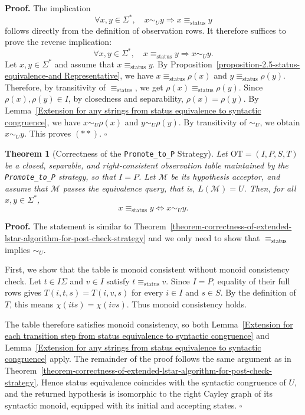 \documentclass{ieice-tecrep}
\newtheorem{theorem}{Theorem}
\begin{document}
\noindent\textbf{Proof.}
The implication
\[
   \forall x,y\in\Sigma^*,\quad
   x\sim_U y
   \Longrightarrow
   x\equiv_{\mathrm{status}}y
\]
follows directly from the definition of observation rows. It therefore
suffices to prove the reverse implication:
\[
\forall x,y\in\Sigma^*,\quad
x\equiv_{\mathrm{status}}y
\Longrightarrow
x\sim_U y. \tag{**}
\]
Let \(x,y\in\Sigma^*\) and assume that \(x\equiv_{\mathrm{status}}y\).
By Proposition~\ref{proposition-2.5-status-equivalence-and Representative},
we have \(x\equiv_{\mathrm{status}}\rho(x)\) and \(y\equiv_{\mathrm{status}}\rho(y)\).
Therefore, by transitivity of \(\equiv_{\mathrm{status}}\), we get \(\rho(x)\equiv_{\mathrm{status}}\rho(y)\).
Since \(\rho(x),\rho(y)\in I\), by closedness and separability, \(\rho(x) = \rho(y)\).
By Lemma~\ref{Extension for any strings from status equivalence to syntactic congruence},
we have \(x\sim_U\rho(x)\) and \(y\sim_U\rho(y)\).
By transitivity of \(\sim_U\), we obtain \(x\sim_U y\). This proves \((**)\).  \hfill $\square$

\begin{theorem}[Correctness of the \texttt{Promote\_to\_P} Strategy]
\label{theorem-correctness-of-the-promote_to_p-strategy}
Let \(\mathrm{OT}=(I,P,S,T)\) be a closed, separable, and right-consistent
observation table maintained by the \texttt{Promote\_to\_P} strategy,
so that \(I = P\).
Let \(\mathcal M\) be its hypothesis acceptor, and assume that
\(\mathcal M\) passes the equivalence query, that is,
\(L(\mathcal M)=U\).
Then, for all \(x,y\in\Sigma^*\),
\[
x\equiv_{\mathrm{status}}y
\Longleftrightarrow x\sim_U y.
\]
\end{theorem}
\noindent\textbf{Proof.}
The statement is similar to Theorem~\ref{theorem-correctness-of-extended-lstar-algorithm-for-post-check-strategy} and we
only need to show that \(\equiv_{\mathrm{status}}\) implies \(\sim_U\).

First, we show that the table is monoid consistent without monoid consistency check.
Let \(t\in I\Sigma\) and \(v\in I\) satisfy
\(t\equiv_{\mathrm{status}}v\).
Since \(I = P\), equality of their full rows gives
\(T(i,t,s)=T(i,v,s)\) for every \(i\in I\) and \(s\in S\).
By the definition of \(T\), this means
\(\chi(its)=\chi(ivs)\).
Thus monoid consistency holds.

The table therefore satisfies monoid consistency, so both
Lemma~\ref{Extension for each transition step from status equivalence to syntactic congruence}
and
Lemma~\ref{Extension for any strings from status equivalence to syntactic congruence}
apply. The remainder of the proof follows the same argument as in
Theorem~\ref{theorem-correctness-of-extended-lstar-algorithm-for-post-check-strategy}.
Hence status equivalence coincides with the syntactic congruence
of \(U\), and the returned hypothesis is isomorphic to the right
Cayley graph of its syntactic monoid, equipped with its initial
and accepting states.
\hfill $\square$
\end{document}
